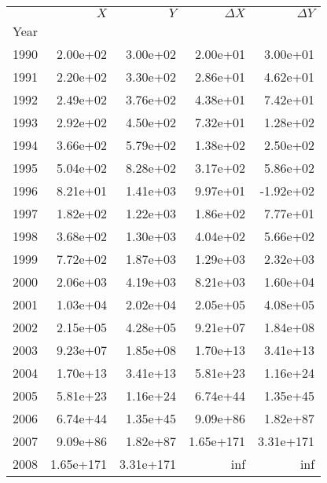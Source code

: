 \begin{tabular}{lrrrr}
\toprule
{} &     \(X\) &     \(Y\) & \(\Delta X\) & \(\Delta Y\) \\
Year &           &           &              &              \\
\midrule
1990 &  2.00e+02 &  3.00e+02 &     2.00e+01 &     3.00e+01 \\
1991 &  2.20e+02 &  3.30e+02 &     2.86e+01 &     4.62e+01 \\
1992 &  2.49e+02 &  3.76e+02 &     4.38e+01 &     7.42e+01 \\
1993 &  2.92e+02 &  4.50e+02 &     7.32e+01 &     1.28e+02 \\
1994 &  3.66e+02 &  5.79e+02 &     1.38e+02 &     2.50e+02 \\
1995 &  5.04e+02 &  8.28e+02 &     3.17e+02 &     5.86e+02 \\
1996 &  8.21e+01 &  1.41e+03 &     9.97e+01 &    -1.92e+02 \\
1997 &  1.82e+02 &  1.22e+03 &     1.86e+02 &     7.77e+01 \\
1998 &  3.68e+02 &  1.30e+03 &     4.04e+02 &     5.66e+02 \\
1999 &  7.72e+02 &  1.87e+03 &     1.29e+03 &     2.32e+03 \\
2000 &  2.06e+03 &  4.19e+03 &     8.21e+03 &     1.60e+04 \\
2001 &  1.03e+04 &  2.02e+04 &     2.05e+05 &     4.08e+05 \\
2002 &  2.15e+05 &  4.28e+05 &     9.21e+07 &     1.84e+08 \\
2003 &  9.23e+07 &  1.85e+08 &     1.70e+13 &     3.41e+13 \\
2004 &  1.70e+13 &  3.41e+13 &     5.81e+23 &     1.16e+24 \\
2005 &  5.81e+23 &  1.16e+24 &     6.74e+44 &     1.35e+45 \\
2006 &  6.74e+44 &  1.35e+45 &     9.09e+86 &     1.82e+87 \\
2007 &  9.09e+86 &  1.82e+87 &    1.65e+171 &    3.31e+171 \\
2008 & 1.65e+171 & 3.31e+171 &          inf &          inf \\
\bottomrule
\end{tabular}
